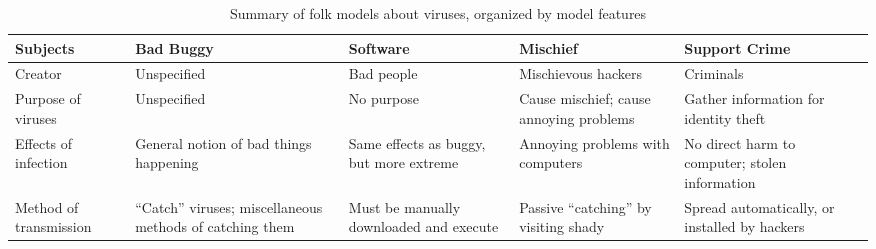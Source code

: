 \documentclass{ledger}
\begin{document}
\begin{table}[H]
\centering
\begin{tabular}{p{2cm}|p{2cm}|p{2cm}|p{2cm}|p{2cm}}
     \hline
     Subjects & Bad Buggy & Software & Mischief & Support Crime \\
     \hline
     Creator & Unspecified & Bad  people  & Mischievous hackers  & Criminals \\
     \hline
     Purpose of viruses & Unspecified & No purpose & Cause mischief; cause annoying problems & Gather information for identity theft\\
     \hline
     Effects of infection  & General notion of bad things happening & Same effects as buggy, but more extreme & Annoying problems with computers & No direct harm to computer; stolen information\\ 
     \hline
     Method of transmission & “Catch” viruses; miscellaneous methods of catching them &
     Must be manually downloaded and execute &
     Passive “catching” by visiting shady  &
     Spread automatically, or installed by hackers \\
     \hline
\end{tabular}
\caption{Summary of folk models about viruses, organized by model features}
\label{table1:data}
\end{table}
\end{document}
